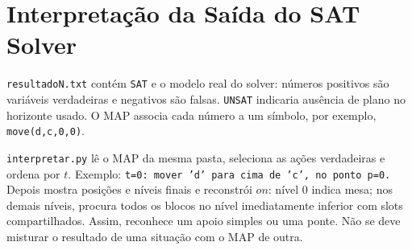 \documentclass[11pt,a4paper]{article}
\newcommand{\code}[1]{\texttt{#1}}
\begin{document}
\section{Interpretação da Saída do SAT Solver}
\code{resultadoN.txt} contém \code{SAT} e o modelo real do solver: números positivos são variáveis verdadeiras e negativos são falsas. \code{UNSAT} indicaria ausência de plano no horizonte usado. O MAP associa cada número a um símbolo, por exemplo, \code{move(d,c,0,0)}.

\code{interpretar.py} lê o MAP da mesma pasta, seleciona as ações verdadeiras e ordena por $t$. Exemplo: \code{t=0: mover 'd' para cima de 'c', no ponto p=0.} Depois mostra posições e níveis finais e reconstrói $on$: nível 0 indica mesa; nos demais níveis, procura todos os blocos no nível imediatamente inferior com slots compartilhados. Assim, reconhece um apoio simples ou uma ponte. Não se deve misturar o resultado de uma situação com o MAP de outra.
\end{document}
